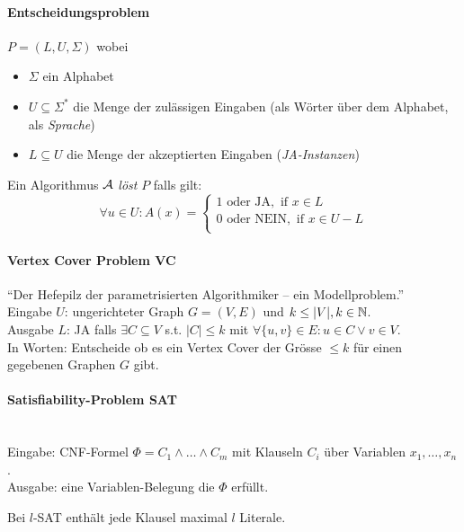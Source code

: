 \paragraph{Entscheidungsproblem}
$P = (L, U, \Sigma)$ wobei
\begin{itemize}
    \item $\Sigma$ ein Alphabet
    \item $U \subseteq \Sigma^*$ die Menge der zulässigen Eingaben (als Wörter über dem Alphabet, als \emph{Sprache})
    \item $L \subseteq U$ die Menge der akzeptierten Eingaben (\emph{JA-Instanzen})
\end{itemize}
Ein Algorithmus $\mathcal{A}$ \emph{löst} $P$ falls gilt:
$$ \forall u \in U : A(x) =
\begin{cases}
1 \text{ oder JA}, \text{ if } x \in L \\
0 \text{ oder NEIN}, \text{ if } x \in U-L \\
\end{cases}
$$

\paragraph{Vertex Cover Problem VC}
``Der Hefepilz der parametrisierten Algorithmiker -- ein Modellproblem.''
\\
Eingabe $U$: ungerichteter Graph $G = (V, E)$ und $k \leq |V|, k \in \mathbb{N}$. \\
Ausgabe $L$: JA falls $\exists C \subseteq V$ s.t. $|C| \leq k$ mit $\forall \{u, v \} \in E: u \in C \vee v \in V$.\\
In Worten: Entscheide ob es ein Vertex Cover der Grösse $\leq k$ für einen gegebenen Graphen $G$ gibt.

\paragraph{Satisfiability-Problem SAT} \mbox{} \\
Eingabe: CNF-Formel $\Phi = C_1 \wedge \dots \wedge C_m$ mit Klauseln $C_i$ über Variablen $x_1, \dots, x_n$. \\
Ausgabe: eine Variablen-Belegung die $\Phi$ erfüllt.

Bei $l$-SAT enthält jede Klausel maximal $l$ Literale.

